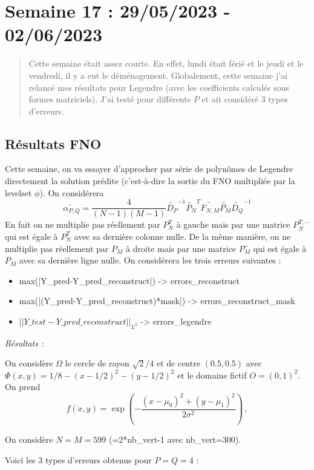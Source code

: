 \section{Semaine 17 : 29/05/2023 - 02/06/2023}
\graphicspath{{semaines/semaine_17/images/}}

\begin{abstract}
	Cette semaine était assez courte. En effet, lundi était férié et le jeudi et le vendredi, il y a eut le déménagement.
	Globalement, cette semaine j'ai relancé mes résultats pour Legendre (avec les coefficients calculés sous formes matriciels). J'ai testé pour différents $P$ et ait considéré 3 types d'erreurs.
\end{abstract}

\subsection{Résultats FNO}

Cette semaine, on va essayer d'approcher par série de polynômes de Legendre directement la solution prédite (c'est-à-dire la sortie du FNO multipliée par la levelset $\phi$). On considérera
$$\widetilde{\alpha_{P,Q}}=\frac{4}{(N-1)(M-1)}\widetilde{D_P}^{-1}\widetilde{P_N}^T\widetilde{F_{N,M}}\widetilde{P_M}\widetilde{D_Q}^{-1}$$ 
En fait on ne multiplie pas réellement par $P_N^T$ à gauche mais par une matrice $P_N^{T,-}$ qui est égale à $P_N^T$ avec sa dernière colonne nulle. De la même manière, on ne multiplie pas réellement par $P_M$ à droite mais par une matrice $P_M^{-}$ qui est égale à $P_M$ avec sa dernière ligne nulle. 
On considérera les trois erreurs suivantes :
\begin{itemize}
	\item max(|Y\_pred-Y\_pred\_reconstruct|) -> errors\_reconstruct
	\item max(|(Y\_pred-Y\_pred\_reconstruct)*mask|) -> errors\_reconstruct\_mask
	\item $||Y\_test-Y\_pred\_reconstruct||_{L^2}$  -> errors\_legendre
\end{itemize}

\textit{Résultats :}

On considère $\Omega$ le cercle de rayon $\sqrt{2}/4$ et de centre $(0.5,0.5)$ avec $\Phi(x,y)=1/8-(x-1/2)^2-(y-1/2)^2$ et le domaine fictif $O=(0,1)^2$.
On prend
$$f(x,y) = \exp\left(-\frac{(x-\mu_0)^2 + (y-\mu_1)^2}{2\sigma^2}\right)\,, $$ 

On considère $N=M=599$ (=2*nb\_vert-1 avec nb\_vert=300).

Voici les 3 types d'erreurs obtenus pour $P=Q=4$ :

